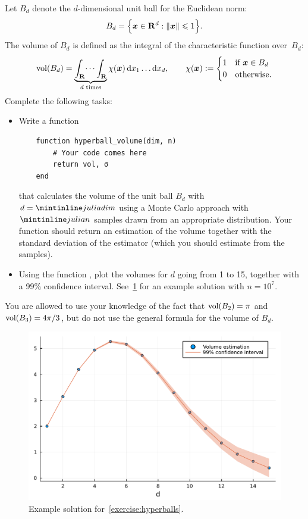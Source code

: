 \begin{compexercise}
    \label{exercise:hyperballs}
    Let $B_{d}$ denote the $d$-dimensional unit ball for the Euclidean norm:
    \[
        B_{d} = \Bigl\{ \mathbf{\boldsymbol{x}} \in \mathbf R^d : \lVert\mathbf{\boldsymbol{x}}\rVert \leqslant 1 \Bigr\}.
    \]
    The volume of $B_{d}$ is defined as the integral of the characteristic function over~$B_d$:
    \[
        {\rm vol}(B_d) = \underbrace{\int_{\mathbf R} \dots \int_{\mathbf R}}_{\text{$d$ times}} \chi(\mathbf{\boldsymbol{x}}) \, \mathrm d x_1 \dots \mathrm d x_d,
        \qquad
        \chi(\mathbf{\boldsymbol{x}}) :=
        \begin{cases}
            1 & \text{if $\mathbf{\boldsymbol{x}} \in B_d$} \\
            0 & \text{otherwise.}
        \end{cases}
    \]
    Complete the following tasks:
    \begin{itemize}
        \item
            Write a function
    \begin{verbatim}
    function hyperball_volume(dim, n)
        # Your code comes here
        return vol, σ
    end
    \end{verbatim}
            that calculates the volume of the unit ball $B_{d}$ with $d = \julia{dim}$
            using a Monte Carlo approach with~$\julia{n}$ samples drawn from an appropriate distribution.
            Your function should return an estimation of the volume
            together with the standard deviation of the estimator
            (which you should estimate from the samples).

        \item
            Using the function ,
            plot the volumes for $d$ going from 1 to 15,
            together with a 99\% confidence interval.
            See~\cref{fig:hyperballs} for an example solution with $n = 10^7$.
    \end{itemize}
    You are allowed to use your knowledge of the fact that
    ${\rm vol}(B_2) = \pi$ and ${\rm vol}(B_3) = 4\pi/3$,
    but do not use the general formula for the volume of $B_d$.
\end{compexercise}
\begin{figure}[ht]
    \centering
    \includegraphics[width=0.8\linewidth]{figures/hyperballs.pdf}
    \caption{Example solution for~\cref{exercise:hyperballs}.}%
    \label{fig:hyperballs}
\end{figure}

